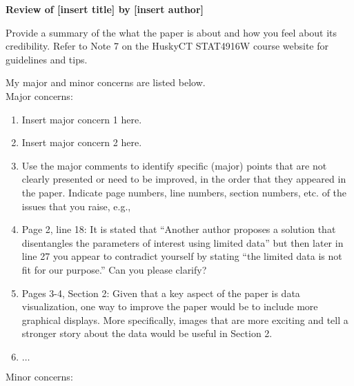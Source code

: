 \documentclass[11pt]{article}
\begin{document}
\begin{center} \Large \bf
  Review of [insert title] by [insert author]
\end{center}


Provide a summary of the what the paper is about and how you feel about its 
credibility. Refer to Note 7 on the HuskyCT STAT4916W course website for 
guidelines and tips.


My major and minor concerns are listed below.\\

\noindent Major concerns:

\begin{enumerate}

\item Insert major concern 1 here.

\item Insert major concern 2 here.

\item Use the major comments to identify specific (major) points that are not 
clearly presented or need to be improved, in the order that they appeared in 
the paper. Indicate page numbers, line numbers, section numbers, etc.  
of the issues that you raise, e.g.,

\item Page 2, line 18: It is stated that ``Another author proposes a solution
that disentangles the parameters of interest using limited data'' but then later
in line 27 you appear to contradict yourself by stating ``the limited data is not 
fit for our purpose.''  Can you please clarify?

\item Pages 3-4, Section 2: Given that a key aspect of the paper is data 
visualization, one way to improve the paper would be to include more graphical
displays.  More specifically, images that are more exciting and tell a stronger
story about the data would be useful in Section 2. 

\item $\ldots$

\end{enumerate}


\noindent Minor concerns:
\end{document}
